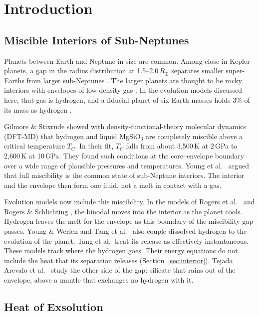 \chapter{Introduction}\label{ch:introduction}

\section{Miscible Interiors of Sub-Neptunes}

Planets between Earth and Neptune in size are common. Among close-in Kepler planets, a gap in the
radius distribution at 1.5--2.0\,$R_\oplus$ separates smaller super-Earths from larger
sub-Neptunes \cite{fulton2017}. The larger planets are thought to be rocky interiors with
envelopes of low-density gas \cite{fulton2017}. In the evolution models discussed here, that gas
is hydrogen, and a fiducial planet of six Earth masses holds 3\% of its mass as hydrogen
\cite{rogers2025}.

Gilmore \& Stixrude \cite{gilmore2026} showed with density-functional-theory molecular dynamics
(DFT-MD) that hydrogen and liquid MgSiO$_3$ are completely miscible above a critical temperature
$T_C$. In their fit, $T_C$ falls from about 3,500\,K at 2\,GPa to 2,600\,K at 10\,GPa. They
found such conditions at the core--envelope boundary over a wide range of plausible pressures
and temperatures. Young et al.\ \cite{young2025} argued that full miscibility is the common state
of sub-Neptune interiors. The interior and the envelope then form one fluid, not a melt in
contact with a gas.

Evolution models now include this miscibility. In the models of Rogers et al.\ \cite{rogers2025}
and Rogers \& Schlichting \cite{rogers2026}, the binodal moves into the interior as the planet
cools. Hydrogen leaves the melt for the envelope as this boundary of the miscibility gap passes.
Young \& Werlen \cite{young2026} and Tang et al.\ \cite{tang2026} also couple dissolved hydrogen to
the evolution of the planet. Tang et al.\ treat its release as effectively instantaneous. These
models track where the hydrogen goes. Their energy equations do not include the heat that its
separation releases (Section~\ref{sec:interior}). Tejada Arevalo et al.\ \cite{tejada2026} study
the other side of the gap: silicate that rains out of the envelope, above a mantle that exchanges
no hydrogen with it.

\section{Heat of Exsolution}

